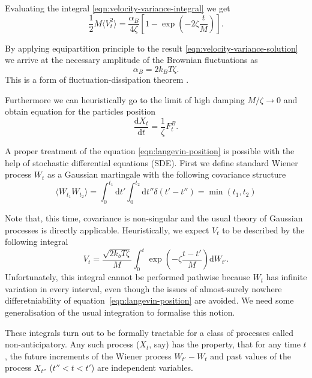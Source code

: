 \documentclass{doctoral}
\newcommand{\dd}{\mathrm{d}}
\begin{document}
Evaluating the integral \eqref{eqn:velocity-variance-integral} we get
\begin{equation}
    \frac{1}{2} M \langle V_t^2 \rangle = \frac{\alpha_B}{4 \zeta} \left[ 1 - \exp \left(-2\zeta \frac{t}{M} \right) \right].
    \label{eqn:velocity-variance-solution}
\end{equation}

By applying equipartition principle to the result \eqref{eqn:velocity-variance-solution} we arrive at the necessary amplitude of the Brownian fluctuations as
\begin{equation}
    \alpha_B = 2 k_B T \zeta.
    \label{eqn:fluctuation-dissipation-raighley-particle}
\end{equation}
This is a form of fluctuation-dissipation theorem \cite{van_Kampen_1984,Ottinger_2012}.

Furthermore we can heuristically go to the limit of high damping $M/\zeta \to 0$ and obtain equation for the particles position
\begin{equation}
    \frac{\dd X_t}{\dd t} = \frac{1}{\zeta} F_t^B.
    \label{eqn:langevin-position}
\end{equation}

A proper treatment of the equation \eqref{eqn:langevin-position} is possible with the help of stochastic differential equations (SDE).
First we define standard Wiener process $W_t$ as a Gaussian martingale with the following covariance structure
\begin{equation}
    \langle W_{t_1} W_{t_2} \rangle = \int_0^{t_1} \dd t' \int_0^{t_2} \dd t'' \delta(t' - t'') = \min(t_1, t_2) \label{eqn:wiener-process-definition}
\end{equation}

Note that, this time, covariance is non-singular and the usual theory of Gaussian processes is directly applicable.
Heuristically, we expect $V_t$ to be described by the following integral
\begin{equation}
    V_t = \frac{\sqrt{2 k_b T \zeta}}{M} \int_0^t \exp\left( -\zeta\frac{t - t'}{M} \right) \dd W_{t'}.
    \label{eqn:velocity-integral-sde}
\end{equation}
Unfortunately, this integral cannot be performed pathwise because $W_t$ has infinite variation in every interval, even though the issues of almost-surely nowhere differetniability of equation~\eqref{eqn:langevin-position} are avoided.
We need some generalisation of the usual integration to formalise this notion.

These integrals turn out to be formally tractable for a class of processes called non-anticipatory.
Any such process ($X_t$, say) has the property, that for any time $t$, the future increments of the Wiener process $W_{t'} - W_t$ and past values of the process $X_{t''}$ ($t'' < t < t'$) are independent variables.
\end{document}
